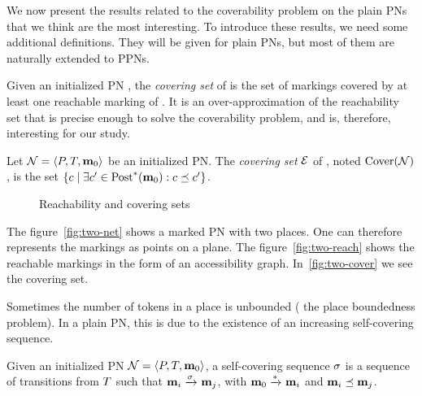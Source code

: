 We now present the results related to the coverability problem on the plain \acp{PN} that we think are the most interesting.
To introduce these results, we need some additional definitions.
They will be given for plain \acp{PN}, but most of them are naturally extended to \acp{PPN}.

Given an initialized \ac{PN} \namePN, the \emph{covering set} of \namePN is the set of markings covered by at least one reachable marking of \namePN.
It is an over-approximation of the reachability set that is precise enough to solve the coverability problem, and is, therefore, interesting for our study.

\begin{defi}
  Let $\mathcal{N} = \left\langle P, T, \mathbf{m}_0\right\rangle$ be an initialized \ac{PN}.
  The \emph{covering set} $\mathcal{E}$ of \namePN, noted $\operatorname{Cover}(\mathcal{N})$, is the set $\left\{c \mid \exists c' \in \operatorname{Post}^*_{}(\mathbf{m}_0) : c \preceq c' \right\}$.
\end{defi}


\begin{figure}[htbp]
  \label{fig:reach-and-cover-example}
  \centering
  \subfloat[A \ac{PN} ($\card{\places} = 2$)]{
    \label{fig:two-net}
    

  }

  \qquad
  \caption{Reachability and covering sets}
\end{figure}

The figure~\ref{fig:two-net} shows a marked \ac{PN} with two places.
One can therefore represents the markings as points on a plane.
The figure~\ref{fig:two-reach} shows the reachable markings in the form of an accessibility graph.
In~\ref{fig:two-cover} we see the covering set.

Sometimes the number of tokens in a place is unbounded ( the place boundedness problem).
In a plain \ac{PN}, this is due to the existence of an increasing self-covering sequence.
\begin{defi}
  Given an initialized \ac{PN} $\mathcal{N} = \left\langle P, T, \mathbf{m}_0\right\rangle$,
  a self-covering sequence $\seqt$ is a sequence of transitions from $T$ such that 
  \(
    \mar_i \fire{\seqt} \mar_j
  \),
  with $\mathbf{m}_0 \xrightarrow{*}_{} \mathbf{m}_i$ %
  and $\mathbf{m}_i \preceq \mathbf{m}_j$.
\end{defi}


